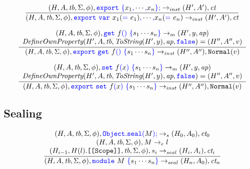 \documentclass[a4paper]{article}
\newcommand{\code}[1]{\textcolor{blue}{\tt #1}}
\newcommand{\tb}{\emph{tb}}
\newcommand{\ct}{\emph{ct}}
\newcommand{\ap}{\emph{ap}}
\begin{document}
\begin{equation*}
\frac{
    (H, A, \tb, \Sigma, \phi), \code{export}\ \code{\{}x_1\code{,} \cdots\code{,} x_n\code{\}}\code{;} \rightarrow_{inst} (H', A'), \ct
}{
    (H, A, \tb, \Sigma, \phi), \code{export}\ \code{var}\ x_1(\code{=}\ e_1)\code{,} \cdots\code{,}x_n(\code{=}\ e_n) \rightarrow_{inst} (H', A'), \ct
}
\end{equation*}

\begin{equation*}
\frac{
    \begin{array}{c}
    (H, A, \tb, \Sigma, \phi), \code{get}\ f\code{(}\code{)}\ \code{\{} s_1 \cdots s_n \code{\}} \rightarrow_m (H', y,\ap) \\
    \emph{DefineOwnProperty}(H', A, \tb, \emph{ToString}(H', y), \ap, \code{false}) = (H'', A'', v)
    \end{array}
}{
    (H, A, \tb, \Sigma, \phi), \code{export}\ \code{get}\ f\code{(}\code{)}\ \code{\{} s_1 \cdots s_n \code{\}} \rightarrow_{inst} (H'', A''), \texttt{Normal}(v)
}
\end{equation*}

\begin{equation*}
\frac{
    \begin{array}{c}
    (H, A, \tb, \Sigma, \phi), \code{set}\ f\code{(}x\code{)}\ \code{\{} s_1 \cdots s_n \code{\}} \rightarrow_m (H', y,\ap) \\
    \emph{DefineOwnProperty}(H', A, \tb, \emph{ToString}(H', y), \ap, \code{false}) = (H'', A'', v)
    \end{array}
}{
    (H, A, \tb, \Sigma, \phi), \code{export}\ \code{set}\ f\code{(}x\code{)}\ \code{\{} s_1 \cdots s_n \code{\}} \rightarrow_{inst} (H'', A''), \texttt{Normal}(v)
}
\end{equation*}

\subsection{Sealing}

\begin{equation*}
\frac{
    \begin{array}{c}
    (H, A, \tb, \Sigma, \phi), \code{Object.seal(}M\code{);} \rightarrow_s (H_0, A_0), \ct_0 \\
    (H, A, \tb, \Sigma, \phi), M \rightarrow_e l \\
    (H_{i-1}, H(l).\texttt{[[Scope]]}, \tb, \Sigma, \phi), s_i \rightarrow_{seal} (H_i, A_i), \ct_i \\
    \end{array}
}{
    (H, A, \tb, \Sigma, \phi), \code{module}\ M\ \code{\{} s_1 \cdots s_n \code{\}} \rightarrow_{seal} (H_n, A_0), \ct_n
}
\end{equation*}
\end{document}
